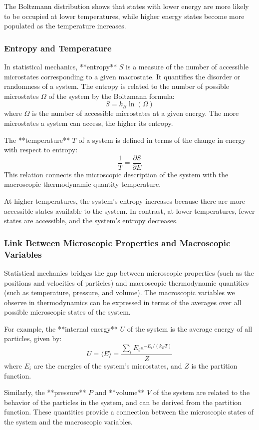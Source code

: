 \documentclass{article}
\begin{document}
The Boltzmann distribution shows that states with lower energy are more likely to be occupied at lower temperatures, while higher energy states become more populated as the temperature increases.

\subsubsection*{Entropy and Temperature}

In statistical mechanics, **entropy** \( S \) is a measure of the number of accessible microstates corresponding to a given macrostate. It quantifies the disorder or randomness of a system. The entropy is related to the number of possible microstates \( \Omega \) of the system by the Boltzmann formula:
\[
S = k_B \ln(\Omega)
\]
where \( \Omega \) is the number of accessible microstates at a given energy. The more microstates a system can access, the higher its entropy.

The **temperature** \( T \) of a system is defined in terms of the change in energy with respect to entropy:
\[
\frac{1}{T} = \frac{\partial S}{\partial E}
\]
This relation connects the microscopic description of the system with the macroscopic thermodynamic quantity temperature.

At higher temperatures, the system's entropy increases because there are more accessible states available to the system. In contrast, at lower temperatures, fewer states are accessible, and the system's entropy decreases.

\subsubsection*{Link Between Microscopic Properties and Macroscopic Variables}

Statistical mechanics bridges the gap between microscopic properties (such as the positions and velocities of particles) and macroscopic thermodynamic quantities (such as temperature, pressure, and volume). The macroscopic variables we observe in thermodynamics can be expressed in terms of the averages over all possible microscopic states of the system.

For example, the **internal energy** \( U \) of the system is the average energy of all particles, given by:
\[
U = \langle E \rangle = \frac{\sum_{i} E_i e^{-E_i/(k_B T)}}{Z}
\]
where \( E_i \) are the energies of the system's microstates, and \( Z \) is the partition function.

Similarly, the **pressure** \( P \) and **volume** \( V \) of the system are related to the behavior of the particles in the system, and can be derived from the partition function. These quantities provide a connection between the microscopic states of the system and the macroscopic variables.
\end{document}
